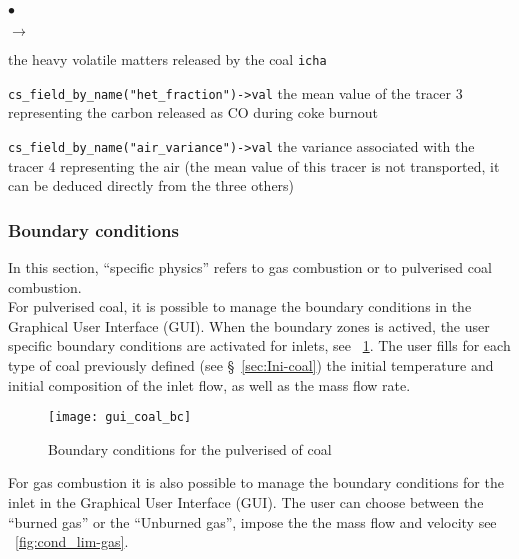 \begin{list}{$\bullet$}{}
\begin{list}{$\rightarrow$}{}
\begin{list}{}{}
                                        the heavy volatile matters released by
                                        the coal \texttt{icha}
                                  \item \texttt{cs\_field\_by\_name("het\_fraction")->val}
                                        the mean value of the tracer 3
                                        representing the carbon released
                                        as CO during coke burnout
                                  \item \texttt{cs\_field\_by\_name("air\_variance")->val} the
                                  variance associated with the tracer 4
                                  representing the air (the mean value of this
                                  tracer is not transported, it can be deduced
                                  directly from the three others)
                           \end{list}
              \end{list}
\end{list}

\subsubsection{Boundary conditions}\label{sec:coal-cl}
In this section, ``specific physics'' refers to gas combustion or
to pulverised coal combustion.\\
For pulverised coal, it is possible to manage the boundary conditions in the Graphical User Interface (GUI). When the boundary zones is actived, the user specific boundary conditions are activated for inlets, see \figurename~\ref{fig:cond_lim-coal}. The user fills for each type of coal previously defined (see \S~\ref{sec:Ini-coal}) the initial temperature and initial composition of the inlet flow, as well as the mass flow rate.

\begin{figure}[!ht]
\begin{center}
\texttt{[image: gui\_coal\_bc]}
\caption{Boundary conditions for the pulverised of coal}
\label{fig:cond_lim-coal}
\end{center}
\end{figure}

For gas combustion it is also possible to manage the boundary conditions for the inlet in the Graphical User Interface (GUI). The user can choose between the ``burned gas'' or the ``Unburned gas'',
impose the the mass flow and velocity see \figurename~\ref{fig:cond_lim-gas}.


